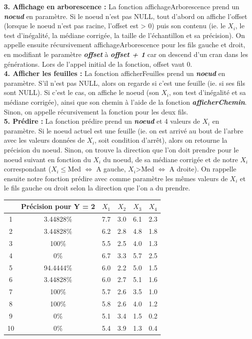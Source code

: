 \noindent
\textbf{3. Affichage en arborescence :} La fonction affichageArborescence prend un \textbf{\textit{noeud}} en paramètre. Si le noeud n'est pas NULL, tout d'abord on affiche l'offset (lorsque le noeud n'est pas racine, l'offset est > 0) puis son contenu (ie. le $X_{i}$, le test d'inégalité, la médiane corrigée, la taille de l'échantillon et sa précision). On appelle ensuite récursivement affichageArborescence pour les fils gauche et droit, en modifiant le paramètre \textbf{\textit{offset}} à \textbf{\textit{offset + 1}} car on descend d'un cran dans les générations. Lors de l'appel initial de la fonction, offset vaut 0.\\

\noindent
\textbf{4. Afficher les feuilles :} La fonction afficherFeuilles prend un \textbf{\textit{noeud}} en paramètre. S'il n'est pas NULL, alors on regarde si c'est une feuille (ie. si ses fils sont NULL). Si c'est le cas, on affiche le noeud (son $X_{i}$, son test d'inégalité et sa médiane corrigée), ainsi que son chemin à l'aide de la fonction \textbf{\textit{afficherChemin}}. Sinon, on appelle récursivement la fonction pour les deux fils.\\

\noindent
\textbf{5. Prédire :} La fonction prédire prend un \textbf{\textit{noeud}} et 4 valeurs de $X_{i}$ en paramètre. Si le noeud actuel est une feuille (ie. on est arrivé au bout de l'arbre avec les valeurs données de $X_{i}$, soit condition d'arrêt), alors on retourne la précision du noeud. Sinon, on trouve la direction que l'on doit prendre pour le noeud suivant en fonction du $X_{i}$ du noeud, de sa médiane corrigée et de notre $X_{i}$ correspondant ($X_{i}\le$Med $\Leftrightarrow$ A gauche, $X_{i}$>Med $\Leftrightarrow$ A droite). On rappelle ensuite notre fonction prédire avec comme paramètre les mêmes valeurs de $X_{i}$ et le fils gauche ou droit selon la direction que l'on a du prendre. \\

\begin{tabular}{|c|c|c|c|c|c|} 
	\cline{2-6}  
	\multicolumn{1}{c|}{} & Précision pour Y = 2 & $\displaystyle{X_{1}}$ & $\displaystyle{X_{2}}$ & $\displaystyle{X_{3}}$ & $\displaystyle{X_{4}}$\\
	\hline
	1 & 3.44828\% & 7.7 & 3.0 & 6.1 & 2.3\\
	\hline
	2 & 3.44828\% & 6.2 & 2.8 & 4.8 & 1.8\\
	\hline
	3 & 100\% & 5.5 & 2.5 & 4.0 & 1.3\\
	\hline
	4 & 0\% & 6.7 & 3.3 & 5.7 & 2.5\\
	\hline
	5 & 94.4444\% & 6.0 & 2.2 & 5.0 & 1.5\\
	\hline
	6 & 3.44828\% & 6.0 & 2.7 & 5.1 & 1.6\\
	\hline
	7 & 100\% & 5.7 & 2.6 & 3.5 & 1.0\\
	\hline
	8 & 100\% & 5.8 & 2.6 & 4.0 & 1.2\\
	\hline
	9 & 0\% & 5.1 & 3.4 & 1.5 & 0.2\\
	\hline
	10 & 0\% & 5.4 & 3.9 & 1.3 & 0.4\\
	\hline
\end{tabular}

